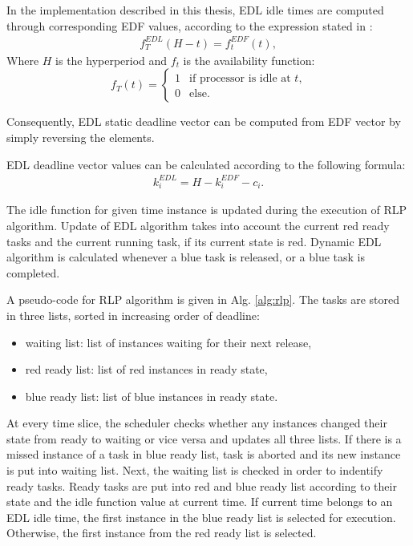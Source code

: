 In the implementation described in this thesis, EDL idle times are computed through corresponding EDF values, according to the expression stated in \cite{chetto1989some}:
\begin{align*}
f_T^{EDL}(H - t) = f_t^{EDF}(t),
\end{align*}
Where $H$ is the hyperperiod and $f_t$ is the availability function:
\begin{equation*}
f_T(t) = \begin{cases}
1 &\text{if processor is idle at $t$,}\\
0 &\text{else.}
\end{cases}
\end{equation*}

Consequently, EDL static deadline vector can be computed from EDF vector by simply reversing the elements.

EDL deadline vector values can be calculated according to the following formula:
\begin{align*}
k_i^{EDL} = H - k_i^{EDF} - c_i.
\end{align*} 

The idle function for given time instance is updated during the execution of RLP algorithm. 
Update of EDL algorithm takes into account the current red ready tasks and the current running task, if its current state is red. 
Dynamic EDL algorithm is calculated whenever a blue task is released, or a blue task is completed. 

A pseudo-code for RLP algorithm is given in Alg. \ref{alg:rlp}.
The tasks are stored in three lists, sorted in increasing order of deadline: 
\begin{itemize}
	\item{waiting list: list of instances waiting for their next release,}
	\item{red ready list: list of red instances in ready state,}
	\item{blue ready list: list of blue instances in ready state.}
\end{itemize}
At every time slice, the scheduler checks whether any instances changed their state from ready to waiting or vice versa and updates all three lists. 
If there is a missed instance of a task in blue ready list, task is aborted and its new instance is put into waiting list. 
Next, the waiting list is checked in order to indentify ready tasks. 
Ready tasks are put into red and blue ready list according to their state and the idle function value at current time. 
If current time belongs to an EDL idle time, the first instance in the blue ready list is selected for execution. Otherwise, the first instance from the red ready list is selected.

